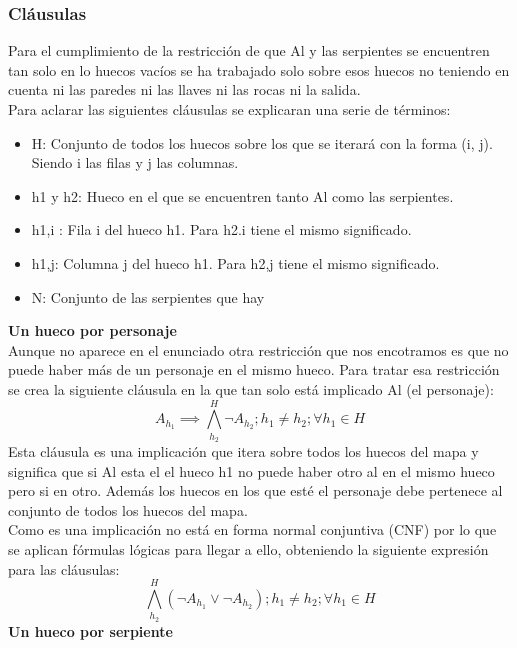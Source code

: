 \documentclass[11pt,spanish]{article}
\begin{document}
			\subsubsection{Cláusulas}
			Para el cumplimiento de la restricción de que Al y las serpientes se encuentren tan solo en lo huecos vacíos se ha trabajado solo sobre esos huecos no teniendo en cuenta ni las paredes ni las llaves ni las rocas ni la salida.\\
			Para aclarar las siguientes cláusulas se explicaran una serie de términos:\\
			\begin{itemize}
				\item H: Conjunto de todos los huecos sobre los que se iterará con la forma (i, j). Siendo i las filas y j las columnas.
				\item h1 y h2: Hueco en el que se encuentren tanto Al como las serpientes.
				\item h1,i : Fila i del hueco h1. Para h2.i tiene el mismo significado.
				\item h1,j: Columna j del hueco h1. Para h2,j tiene el mismo significado.
				\item N: Conjunto de las serpientes que hay
			\end{itemize}
			\textbf{Un hueco por personaje}\\
			Aunque no aparece en el enunciado otra restricción que nos encotramos es que no puede haber más de un personaje en el mismo hueco. Para tratar esa restricción se crea la siguiente cláusula en la que tan solo está implicado Al (el personaje):
			\begin{equation*}
				A_{h_1} \implies \bigwedge\limits_{h_2}^H \neg A_{h_2}; h_1 \neq h_2; \forall h_1\in H
			\end{equation*}
			Esta cláusula es una implicación que itera sobre todos los huecos del mapa y significa que si Al esta el el hueco h1 no puede haber otro al en el mismo hueco pero si en otro. Además los huecos en los que esté el personaje debe pertenece al conjunto de todos los huecos del mapa.\\
			Como es una implicación no está en forma normal conjuntiva (CNF) por lo que se aplican fórmulas lógicas para llegar a ello, obteniendo la siguiente expresión para las cláusulas:
			\begin{equation*}
				\bigwedge\limits_{h_2}^H (\neg A_{h_1} \lor \neg A_{h_2}); h_1 \neq h_2; \forall h_1\in H
			\end{equation*}
			\textbf{Un hueco por serpiente}\\
\end{document}
